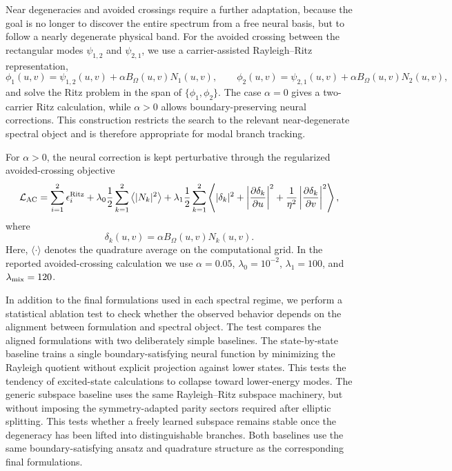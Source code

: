 \documentclass[10pt,onecolumn]{article}
\begin{document}
Near degeneracies and avoided crossings require a further adaptation, because the goal is no longer to discover the entire spectrum from a free neural basis, but to follow a nearly degenerate physical band. For the avoided crossing between the rectangular modes $\psi_{1,2}$ and $\psi_{2,1}$, we use a carrier-assisted Rayleigh--Ritz representation,
\begin{equation}
\phi_1(u,v)=\psi_{1,2}(u,v)+\alpha B_\Omega(u,v)N_1(u,v),
\qquad
\phi_2(u,v)=\psi_{2,1}(u,v)+\alpha B_\Omega(u,v)N_2(u,v),
\label{eq:carrier}
\end{equation}
and solve the Ritz problem in the span of $\{\phi_1,\phi_2\}$. The case $\alpha=0$ gives a two-carrier Ritz calculation, while $\alpha>0$ allows boundary-preserving neural corrections. This construction restricts the search to the relevant near-degenerate spectral object and is therefore appropriate for modal branch tracking.

For $\alpha>0$, the neural correction is kept perturbative through the regularized avoided-crossing objective
\begin{equation}
\mathcal{L}_{\rm AC}
=
\sum_{i=1}^{2}\epsilon_i^{\rm Ritz}
+
\lambda_0
\frac{1}{2}\sum_{k=1}^{2}
\left\langle |N_k|^2 \right\rangle
+
\lambda_1
\frac{1}{2}\sum_{k=1}^{2}
\left\langle
|\delta_k|^2
+
\left|\frac{\partial \delta_k}{\partial u}\right|^2
+
\frac{1}{\eta^2}
\left|\frac{\partial \delta_k}{\partial v}\right|^2
\right\rangle ,
\label{eq:avoidedloss}
\end{equation}
where
\begin{equation}
\delta_k(u,v)=\alpha B_\Omega(u,v)N_k(u,v).
\end{equation}
Here, $\langle\cdot\rangle$ denotes the quadrature average on the computational grid. In the reported avoided-crossing calculation we use $\alpha=0.05$, $\lambda_0=10^{-2}$, $\lambda_1=100$, and $\lambda_{\rm mix}=120$.

In addition to the final formulations used in each spectral regime, we perform a statistical ablation test to check whether the observed behavior depends on the alignment between formulation and spectral object. The test compares the aligned formulations with two deliberately simple baselines. The state-by-state baseline trains a single boundary-satisfying neural function by minimizing the Rayleigh quotient without explicit projection against lower states. This tests the tendency of excited-state calculations to collapse toward lower-energy modes. The generic subspace baseline uses the same Rayleigh--Ritz subspace machinery, but without imposing the symmetry-adapted parity sectors required after elliptic splitting. This tests whether a freely learned subspace remains stable once the degeneracy has been lifted into distinguishable branches. Both baselines use the same boundary-satisfying ansatz and quadrature structure as the corresponding final formulations.
\end{document}
